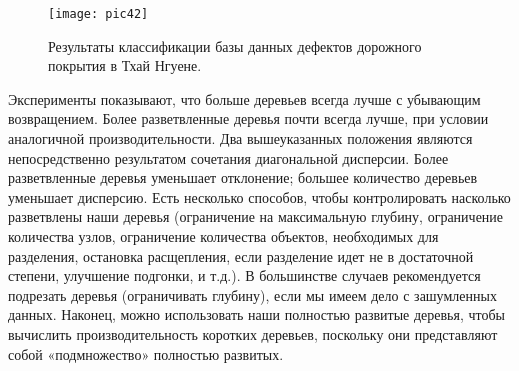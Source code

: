 \documentclass[a4paper,14pt]{extreport}
\begin{document}
\begin{figure}[ht!]
\centering
\texttt{[image: pic42]}
\caption{Результаты классификации базы данных дефектов дорожного покрытия в Тхай Нгуене.}
	\label{pic42}
		\end{figure}
		
Эксперименты показывают, что больше деревьев всегда лучше с убывающим возвращением. Более разветвленные деревья почти всегда лучше, при условии аналогичной производительности. Два вышеуказанных положения являются  непосредственно результатом  сочетания диагональной дисперсии. Более разветвленные деревья уменьшает отклонение; большее количество деревьев  уменьшает дисперсию. Есть несколько способов, чтобы контролировать насколько разветвлены наши деревья (ограничение на максимальную глубину, ограничение количества узлов, ограничение количества объектов, необходимых для разделения, остановка расщепления, если разделение идет не в достаточной степени, улучшение подгонки, и т.д.). В большинстве случаев  рекомендуется подрезать деревья (ограничивать глубину), если мы имеем дело с зашумленных данных. Наконец, можно использовать наши полностью развитые деревья, чтобы вычислить производительность коротких деревьев, поскольку они представляют собой «подмножество»  полностью развитых.
\end{document}
